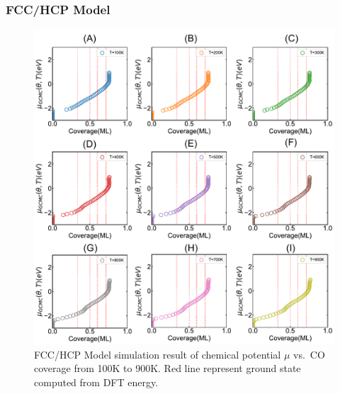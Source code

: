 \documentclass[11pt]{article}
\begin{document}
\subsubsection*{FCC/HCP Model}
\begin{figure} [ht]
\centering
\includegraphics[width=15cm]{Figure/2Miu-T.pdf}
\caption{FCC/HCP Model simulation result of chemical potential $\mu$ vs.\ CO coverage from 100K to 900K. Red line represent ground state computed from DFT energy.}
\label{2miu}
\end{figure}
\clearpage
\end{document}
